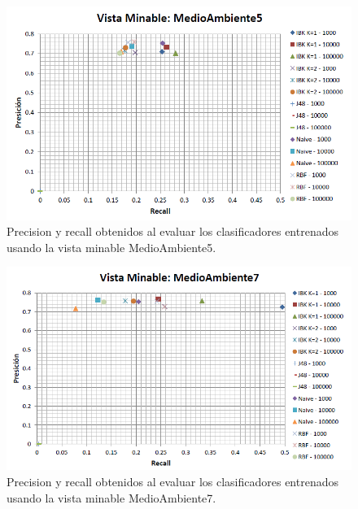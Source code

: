 \documentclass{article}
\begin{document}
\begin{figure}[!htb]
\begin{centering}
\includegraphics[scale=0.75]{medioambiente5}
\par\end{centering}
\caption{Precision y recall obtenidos al evaluar los clasificadores entrenados usando la vista minable MedioAmbiente5.}
\label{fig:figura10}
\end{figure}

\begin{figure}[!htb]
\begin{centering}
\includegraphics[scale=0.75]{medioambiente7}
\par\end{centering}
\caption{Precision y recall obtenidos al evaluar los clasificadores entrenados usando la vista minable MedioAmbiente7.}
\label{fig:figura11}
\end{figure}
\end{document}
